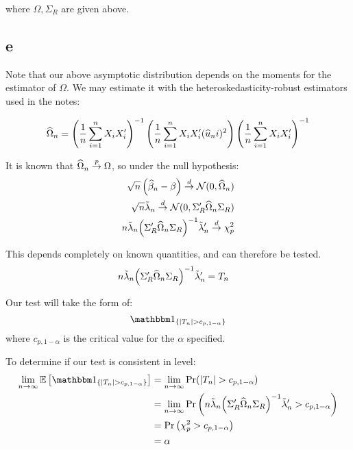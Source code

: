 \documentclass[12pt]{paper}
\begin{document}
where $\Omega, \Sigma_R$ are given above.

\subsection*{e}

Note that our above asymptotic distribution depends on the moments for
the estimator of $\Omega$. We may estimate it with the
heteroskedasticity-robust estimators used in the notes: 

\begin{equation*}
  \widehat{ \Omega }_{n} = {\left( \frac{1}{n}\sum_{i=1}^n X_i X_i' \right)}^{-1}
  \left( \frac{1}{n}\sum_{i=1}^n X_i X_i' (\widehat{ u }_{n}{i})^2 \right)
  {\left( \frac{1}{n}\sum_{i=1}^n X_i X_i' \right)}^{-1}
\end{equation*}

It is known that $\widehat{ \Omega }_{n} \overset{p}{\to} \Omega$, so under the null hypothesis:
\begin{align*}
   \sqrt{n} \left(  \widehat{ \beta }_{n} - \beta \right) \overset{d}{\to} \mathcal{N}( 0,
  \widehat{ \Omega }_{n} )\\
  \sqrt{n} \tilde{ \lambda }_{n} \overset{d}{\to} \mathcal{N}( 0, \Sigma_R' \widehat{ \Omega }_{n} \Sigma_R) \\
  n \tilde{ \lambda }_{n} { \left( \Sigma_R' \widehat{ \Omega }_{n} \Sigma_R \right)}^{-1} \tilde{ \lambda }_{n}'
  \overset{d}{\to} \chi_p^2 \\
\end{align*}

This depends completely on known quantities, and can therefore be
tested.
\begin{align*}
  n \tilde{ \lambda }_{n} { \left( \Sigma_R' \widehat{ \Omega }_{n} \Sigma_R \right)}^{-1} \tilde{ \lambda }_{n}' &= T_n
\end{align*}

Our test will take the form of:
\begin{equation*}
  \indicate{\abs{T_n} > c_{p,1-\alpha}}
\end{equation*}
where $c_{p,1-\alpha}$ is the critical value for the $\alpha$ specified.

To determine if our test is consistent in level:
\begin{align*}
  \lim_{n\rightarrow\infty} \exV{\indicate{\abs{T_n} >  c_{p,1-\alpha}}} &= 
                \lim_{n\rightarrow\infty}\Pr(\abs{T_n}> c_{p,1-\alpha})\\
  &=  \lim_{n\rightarrow\infty} \Pr \left(n \altest{\lambda} \inv{ \left( \Sigma_R' \est{\Omega} \Sigma_R \right)} \altest{\lambda}' >  c_{p,1-\alpha} \right)\\
  &= \Pr \left( \chi_p^2 >  c_{p,1-\alpha} \right)\\
  &= \alpha
\end{align*}
\end{document}
